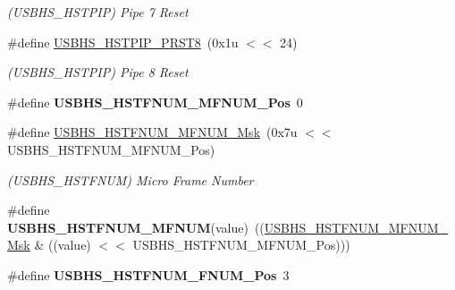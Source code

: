\begin{DoxyCompactItemize}
\begin{DoxyCompactList}\small\item\em (U\+S\+B\+H\+S\+\_\+\+H\+S\+T\+P\+IP) Pipe 7 Reset \end{DoxyCompactList}\item 
\mbox{\label{group__SAME70__USBHS_ga7da6e19c73db3010526a8d3a42c4d49e}} 
\#define \mbox{\hyperlink{group__SAME70__USBHS_ga7da6e19c73db3010526a8d3a42c4d49e}{U\+S\+B\+H\+S\+\_\+\+H\+S\+T\+P\+I\+P\+\_\+\+P\+R\+S\+T8}}~(0x1u $<$$<$ 24)
\begin{DoxyCompactList}\small\item\em (U\+S\+B\+H\+S\+\_\+\+H\+S\+T\+P\+IP) Pipe 8 Reset \end{DoxyCompactList}\item 
\mbox{\label{group__SAME70__USBHS_ga516a648997039419b7b87f9798b97c60}} 
\#define {\bfseries U\+S\+B\+H\+S\+\_\+\+H\+S\+T\+F\+N\+U\+M\+\_\+\+M\+F\+N\+U\+M\+\_\+\+Pos}~0
\item 
\mbox{\label{group__SAME70__USBHS_gaa6eb63a90913102975022647c0b2af3d}} 
\#define \mbox{\hyperlink{group__SAME70__USBHS_gaa6eb63a90913102975022647c0b2af3d}{U\+S\+B\+H\+S\+\_\+\+H\+S\+T\+F\+N\+U\+M\+\_\+\+M\+F\+N\+U\+M\+\_\+\+Msk}}~(0x7u $<$$<$ U\+S\+B\+H\+S\+\_\+\+H\+S\+T\+F\+N\+U\+M\+\_\+\+M\+F\+N\+U\+M\+\_\+\+Pos)
\begin{DoxyCompactList}\small\item\em (U\+S\+B\+H\+S\+\_\+\+H\+S\+T\+F\+N\+UM) Micro Frame Number \end{DoxyCompactList}\item 
\mbox{\label{group__SAME70__USBHS_ga3704452b0f8c713899f51e0a7dc20342}} 
\#define {\bfseries U\+S\+B\+H\+S\+\_\+\+H\+S\+T\+F\+N\+U\+M\+\_\+\+M\+F\+N\+UM}(value)~((\mbox{\hyperlink{group__SAMV71__USBHS_gaa6eb63a90913102975022647c0b2af3d}{U\+S\+B\+H\+S\+\_\+\+H\+S\+T\+F\+N\+U\+M\+\_\+\+M\+F\+N\+U\+M\+\_\+\+Msk}} \& ((value) $<$$<$ U\+S\+B\+H\+S\+\_\+\+H\+S\+T\+F\+N\+U\+M\+\_\+\+M\+F\+N\+U\+M\+\_\+\+Pos)))
\item 
\mbox{\label{group__SAME70__USBHS_gaca6d368cfde9f1c4c6efeba049f87619}} 
\#define {\bfseries U\+S\+B\+H\+S\+\_\+\+H\+S\+T\+F\+N\+U\+M\+\_\+\+F\+N\+U\+M\+\_\+\+Pos}~3
\item 
$$
\end{DoxyCompactItemize}
